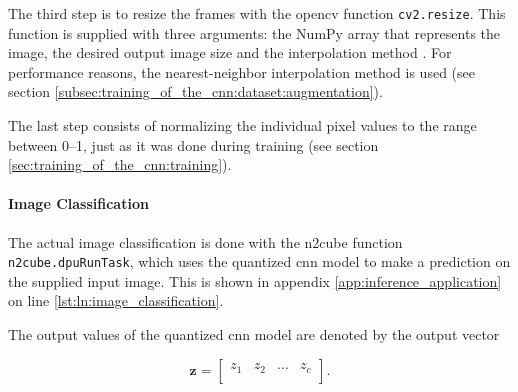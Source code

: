 The third step is to resize the frames with the \acrshort{opencv} function \texttt{cv2.resize}.
This function is supplied with three arguments: the NumPy array that represents the image, the desired output image size and the interpolation method \cite{}. %
For performance reasons, the nearest-neighbor interpolation method is used (see section \ref{subsec:training_of_the_cnn:dataset:augmentation}).

The last step consists of normalizing the individual pixel values to the range between \numrange{0}{1}, just as it was done during training (see section \ref{sec:training_of_the_cnn:training}).

\paragraph{Image Classification}
The actual image classification is done with the \acrshort{n2cube} function \texttt{n2cube.dpuRunTask}, which uses the quantized \acrshort{cnn} model to make a prediction on the supplied input image.
This is shown in appendix \ref{app:inference_application} on line \ref{lst:ln:image_classification}.

The output values of the quantized \acrshort{cnn} model are denoted by the output vector

\begin{equation}
  \boldsymbol{z} =
  \begin{bmatrix}
    z_1 & z_2 & \dots & z_c \\
  \end{bmatrix}.
  \label{eq:output_vector}
\end{equation}

